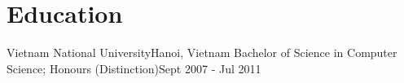 \section{Education}\label{sec:education}
\resumeSubHeadingListStart
    \resumeSubheading
      {Vietnam National University}{Hanoi, Vietnam}
      {Bachelor of Science in Computer Science;  Honours (Distinction)}{Sept 2007 - Jul 2011}
  \resumeSubHeadingListEnd